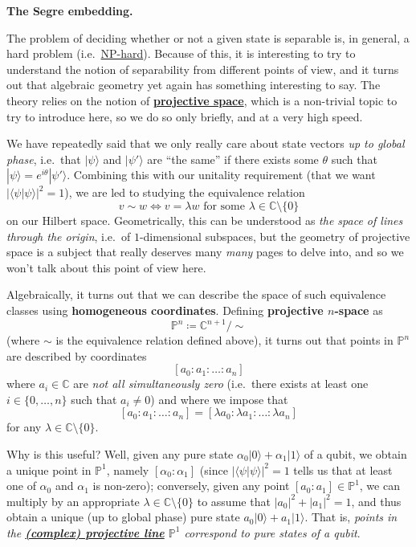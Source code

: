 \documentclass[fleqn,a4paper]{article}
\newenvironment{technical}[1]{\textbf{#1.}\par\vspace{.5\baselineskip}\everypar{\setlength{\parindent}{1.5em}}}{}
\theoremstyle{definition}
\theoremstyle{definition}
\theoremstyle{definition}
\theoremstyle{definition}
\theoremstyle{remark}
\begin{document}
\begin{technical}{The Segre embedding}
The problem of deciding whether or not a given state is separable is, in general, a hard problem (i.e.~\href{https://en.wikipedia.org/wiki/NP-hardness}{NP-hard}).
Because of this, it is interesting to try to understand the notion of separability from different points of view, and it turns out that algebraic geometry yet again has something interesting to say.
The theory relies on the notion of \href{https://en.wikipedia.org/wiki/Projective_space}{\textbf{projective space}}, which is a non-trivial topic to try to introduce here, so we do so only briefly, and at a very high speed.

We have repeatedly said that we only really care about state vectors \emph{up to global phase}, i.e.~that \(|\psi\rangle\) and \(|\psi'\rangle\) are ``the same'' if there exists some \(\theta\) such that \(|\psi\rangle=e^{i\theta}|\psi'\rangle\).
Combining this with our unitality requirement (that we want \(|\langle\psi|\psi\rangle|^2=1\)), we are led to studying the equivalence relation
\[
  v\sim w \iff v=\lambda w \text{ for some }\lambda\in\mathbb{C}\setminus\{0\}
\]
on our Hilbert space.
Geometrically, this can be understood as \emph{the space of lines through the origin}, i.e.~of \(1\)-dimensional subspaces, but the geometry of projective space is a subject that really deserves many \emph{many} pages to delve into, and so we won't talk about this point of view here.

Algebraically, it turns out that we can describe the space of such equivalence classes using \textbf{homogeneous coordinates}.
Defining \textbf{projective \(n\)-space} as
\[
  \mathbb{P}^n
  \coloneqq \mathbb{C}^{n+1}/\sim
\]
(where \(\sim\) is the equivalence relation defined above), it turns out that points in \(\mathbb{P}^n\) are described by coordinates
\[
  [a_0:a_1:\ldots:a_n]
\]
where \(a_i\in\mathbb{C}\) are \emph{not all simultaneously zero} (i.e.~there exists at least one \(i\in\{0,\ldots,n\}\) such that \(a_i\neq0\)) and where we impose that
\[
  [a_0:a_1:\ldots:a_n]
  = [\lambda a_0:\lambda a_1:\ldots:\lambda a_n]
\]
for any \(\lambda\in\mathbb{C}\setminus\{0\}\).

Why is this useful?
Well, given any pure state \(\alpha_0|0\rangle+\alpha_1|1\rangle\) of a qubit, we obtain a unique point in \(\mathbb{P}^1\), namely \([\alpha_0:\alpha_1]\) (since \(|\langle\psi|\psi\rangle|^2=1\) tells us that at least one of \(\alpha_0\) and \(\alpha_1\) is non-zero);
conversely, given any point \([a_0:a_1]\in\mathbb{P}^1\), we can multiply by an appropriate \(\lambda\in\mathbb{C}\setminus\{0\}\) to assume that \(|a_0|^2+|a_1|^2=1\), and thus obtain a unique (up to global phase) pure state \(a_0|0\rangle+a_1|1\rangle\).
That is, \emph{points in the \href{https://en.wikipedia.org/wiki/Riemann_sphere}{\textbf{(complex) projective line}} \(\mathbb{P}^1\) correspond to pure states of a qubit}.


\end{technical}
\end{document}
